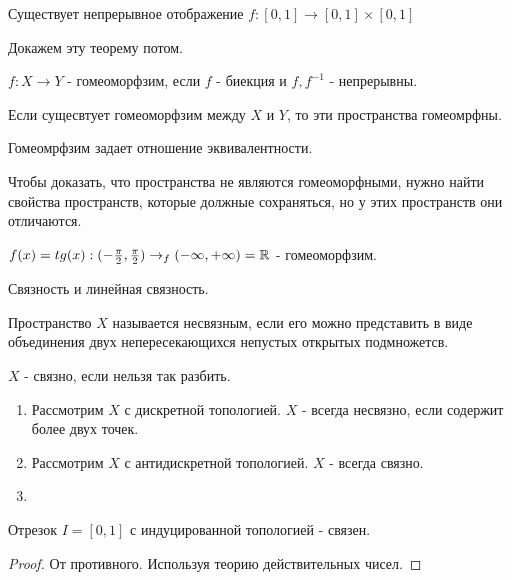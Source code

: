 \begin{theorem}
    Существует непрерывное отображение $f: [0, 1] \rightarrow [0, 1] \times [0, 1]$
\end{theorem}
Докажем эту теорему потом.

\begin{definition}
    $f: X \rightarrow Y$ - гомеоморфзим, если $f$ - биекция и $f, f^{-1}$ - непрерывны.

    Если сущесвтует гомеоморфзим между $X$ и $Y$, то эти пространства гомеомрфны.
\end{definition}

\begin{nota_bene}
    Гомеомрфзим задает отношение эквивалентности.

    Чтобы доказать, что пространства не являются гомеоморфными, нужно найти свойства пространств, которые должные сохраняться, но у этих пространств они отличаются. 
\end{nota_bene}

\begin{example}
    $f(x) = tg(x) : (-\frac{\pi}{2}, \frac{\pi}{2}) \rightarrow_f (-\infty, +\infty) = \mathbb{R}$ - гомеоморфзим.  
\end{example}

Связность и линейная связность.

\begin{definition}
    Пространство $X$ называется несвязным, если его можно представить в виде объединения двух непересекающихся непустых открытых подмножетсв.

    $X$ - связно, если нельзя так разбить.
\end{definition}

\begin{example}
    \begin{enumerate}
        \item Рассмотрим $X$ с дискретной топологией. $X$ - всегда несвязно, если содержит более двух точек.
        \item Рассмотрим $X$ с антидискретной топологией. $X$ - всегда связно.
        \item 
    \end{enumerate}
\end{example}

\begin{theorem}
    Отрезок $I = [0, 1]$ с индуцированной топологией - связен.
\end{theorem}
\begin{proof}
    От противного. Используя теорию действительных чисел. 

\end{proof}

